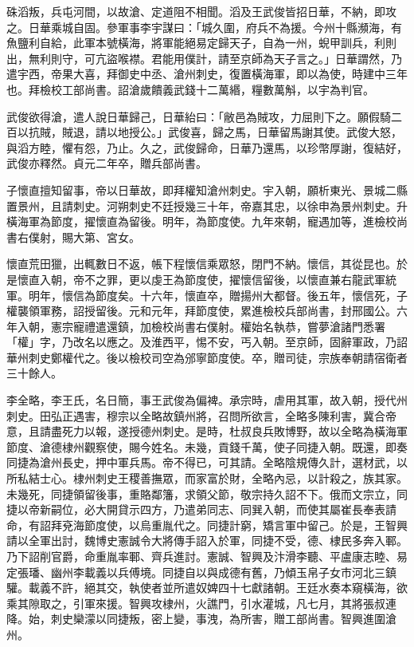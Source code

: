\begin{pinyinscope}
 硃滔叛，兵屯河間，以故滄、定道阻不相聞。滔及王武俊皆招日華，不納，即攻之。日華乘城自固。參軍事李宇謀曰：「城久圍，府兵不為援。今州十縣瀕海，有魚鹽利自給，此軍本號橫海，將軍能絕易定歸天子，自為一州，蜺甲訓兵，利則出，無利則守，可亢盜喉襟。君能用僕計，請至京師為天子言之。」日華謂然，乃遣宇西，帝果大喜，拜御史中丞、滄州刺史，復置橫海軍，即以為使，時建中三年也。拜檢校工部尚書。詔滄歲饋義武錢十二萬緡，糧數萬斛，以宇為判官。



 武俊欲得滄，遣人說日華歸己，日華紿曰：「敝邑為賊攻，力屈則下之。願假騎二百以抗賊，賊退，請以地授公。」武俊喜，歸之馬，日華留馬謝其使。武俊大怒，與滔方睦，懼有怨，乃止。久之，武俊歸命，日華乃還馬，以珍幣厚謝，復結好，武俊亦釋然。貞元二年卒，贈兵部尚書。



 子懷直擅知留事，帝以日華故，即拜權知滄州刺史。宇入朝，願析東光、景城二縣置景州，且請刺史。河朔刺史不廷授幾三十年，帝嘉其忠，以徐申為景州刺史。升橫海軍為節度，擢懷直為留後。明年，為節度使。九年來朝，寵遇加等，進檢校尚書右僕射，賜大第、宮女。



 懷直荒田獵，出輒數日不返，帳下程懷信乘眾怒，閉門不納。懷信，其從昆也。於是懷直入朝，帝不之罪，更以虔王為節度使，擢懷信留後，以懷直兼右龍武軍統軍。明年，懷信為節度矣。十六年，懷直卒，贈揚州大都督。後五年，懷信死，子權襲領軍務，詔授留後。元和元年，拜節度使，累進檢校兵部尚書，封邢國公。六年入朝，憲宗寵禮遣還鎮，加檢校尚書右僕射。權始名執恭，嘗夢滄諸門悉署「權」字，乃改名以應之。及淮西平，惕不安，丐入朝。至京師，固辭軍政，乃詔華州刺史鄭權代之。後以檢校司空為邠寧節度使。卒，贈司徒，宗族奉朝請宿衛者三十餘人。



 李全略，李王氏，名日簡，事王武俊為偏裨。承宗時，虐用其軍，故入朝，授代州刺史。田弘正遇害，穆宗以全略故鎮州將，召問所欲言，全略多陳利害，冀合帝意，且請盡死力以報，遂授德州刺史。是時，杜叔良兵敗博野，故以全略為橫海軍節度、滄德棣州觀察使，賜今姓名。未幾，貢錢千萬，使子同捷入朝。既還，即奏同捷為滄州長史，押中軍兵馬。帝不得已，可其請。全略陰規傳久計，選材武，以所私結士心。棣州刺史王稷善撫眾，而家富於財，全略內忌，以計殺之，族其家。未幾死，同捷領留後事，重賂鄰籓，求領父節，敬宗持久詔不下。俄而文宗立，同捷以帝新嗣位，必大開貸示四方，乃遣弟同志、同巽入朝，而使其屬崔長奉表請命，有詔拜兗海節度使，以烏重胤代之。同捷計窮，矯言軍中留己。於是，王智興請以全軍出討，魏博史憲誠令大將傳手詔入於軍，同捷不受，德、棣民多奔入鄆。乃下詔削官爵，命重胤率鄆、齊兵進討。憲誠、智興及汴滑李聽、平盧康志睦、易定張璠、幽州李載義以兵傅境。同捷自以與成德有舊，乃傾玉帛子女市河北三鎮驩。載義不許，絕其交，執使者並所遣奴婢四十七獻諸朝。王廷水奏本窺橫海，欲乘其隙取之，引軍來援。智興攻棣州，火譙門，引水灌城，凡七月，其將張叔連降。始，刺史欒濛以同捷叛，密上變，事洩，為所害，贈工部尚書。智興進圍滄州。




\end{pinyinscope}
